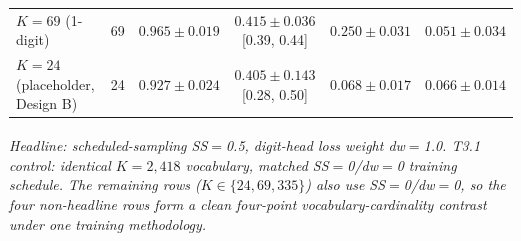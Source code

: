 \begin{table}[ht]
{\begin{tabular}{l c c c c c}
$K\!=\!69$ (1-digit)               &    69 & $0.965 \pm 0.019$ & $0.415 \pm 0.036$ \tiny{[0.39, 0.44]} & $0.250 \pm 0.031$ & $0.051 \pm 0.034$ \\
$K\!=\!24$ (placeholder, Design B) &    24 & $0.927 \pm 0.024$ & $0.405 \pm 0.143$ \tiny{[0.28, 0.50]} & $0.068 \pm 0.017$ & $0.066 \pm 0.014$ \\
\bottomrule
\end{tabular}}
\par\smallskip
\footnotesize\textit{\textsuperscript{\dag}Headline: scheduled-sampling
SS$=$0.5, digit-head loss weight dw$=$1.0.
\textsuperscript{\ddag}T3.1 control: identical $K\!=\!2{,}418$ vocabulary,
matched SS$=$0/dw$=$0 training schedule. The remaining rows
($K\!\in\!\{24, 69, 335\}$) also use SS$=$0/dw$=$0, so the four
non-headline rows form a clean four-point vocabulary-cardinality
contrast under one training methodology.}
\end{table}
